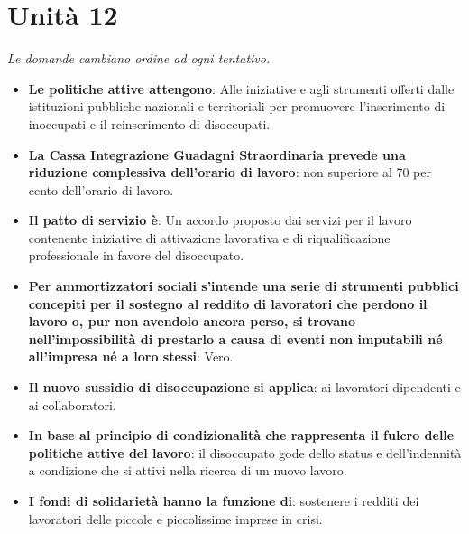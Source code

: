 \documentclass[12pt, a4paper]{report}
\begin{document}
\chapter{Unità 12}
    \textit{Le domande cambiano ordine ad ogni tentativo.}
    \begin{itemize}
        \item \textbf{Le politiche attive attengono}: Alle iniziative e agli strumenti offerti dalle istituzioni pubbliche nazionali e territoriali per promuovere l’inserimento di inoccupati e il reinserimento di disoccupati.
        \item \textbf{La Cassa Integrazione Guadagni Straordinaria prevede una riduzione complessiva dell'orario di lavoro}: non superiore al 70 per cento dell'orario di lavoro.
        \item \textbf{Il patto di servizio è}: Un accordo proposto dai servizi per il lavoro contenente iniziative di attivazione lavorativa e di riqualificazione professionale in favore del disoccupato.
        \item \textbf{Per ammortizzatori sociali s’intende una serie di strumenti pubblici concepiti per il sostegno al reddito di lavoratori che perdono il lavoro o, pur non avendolo ancora perso, si trovano nell’impossibilità di prestarlo a causa di eventi non imputabili né all’impresa né a loro stessi}: Vero.
        \item \textbf{Il nuovo sussidio di disoccupazione si applica}: ai lavoratori dipendenti e ai collaboratori.
        \item \textbf{In base al principio di condizionalità che rappresenta il fulcro delle politiche attive del lavoro}: il disoccupato gode dello status e dell'indennità a condizione che si attivi nella ricerca di un nuovo lavoro.
        \item \textbf{I fondi di solidarietà hanno la funzione di}: sostenere i redditi dei lavoratori delle piccole e piccolissime imprese in crisi.
    \end{itemize}
\end{document}
